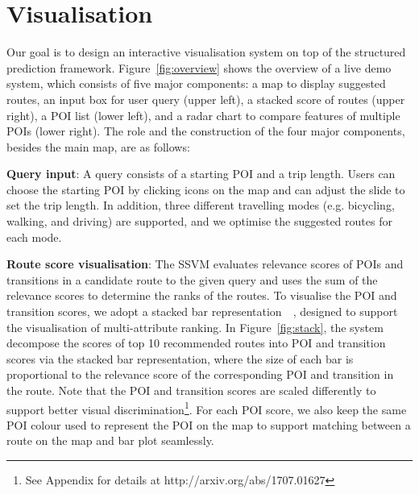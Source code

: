 \section{Visualisation}
Our goal is to design an interactive visualisation system on top of the structured prediction framework.
Figure~\ref{fig:overview} shows the overview of a live demo system, which consists of five major components: a map to display suggested routes, an input box for user query (upper left), a stacked score of routes (upper right), a POI list (lower left), and a radar chart to compare features of multiple POIs (lower right). 
The role and the construction of the four major components, besides the main map, are as follows:

\textbf{Query input}: A query consists of a starting POI and a trip length. 
Users can choose the starting POI by clicking icons on the map and can adjust the slide to set the trip length. 
In addition, three different travelling modes (e.g. bicycling, walking, and driving) are supported, 
and we optimise the suggested routes for each mode.

\textbf{Route score visualisation}: 
The SSVM evaluates relevance scores of POIs and transitions in a candidate route to the given query and uses the sum of the relevance scores to determine the ranks of the routes.
To visualise the POI and transition scores, we adopt a stacked bar representation~~\cite{gratzl2013lineup}, designed to support the visualisation of multi-attribute ranking.
In Figure~\ref{fig:stack}, the system decompose the scores of top 10 recommended routes into POI and transition scores via the stacked bar representation, where the size of each bar is proportional to the relevance score of the corresponding POI and transition in the route.
Note that the POI and transition scores are scaled differently to support better visual discrimination\footnote{See Appendix for details at http://arxiv.org/abs/1707.01627}.
For each POI score, we also keep the same POI colour used to represent the POI on the map to support matching between a route on the map and bar plot seamlessly.


